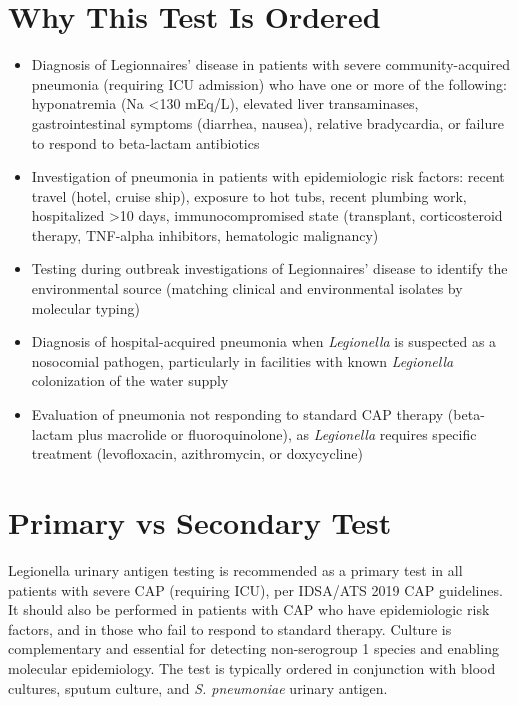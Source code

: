 \section*{Why This Test Is Ordered}
\begin{itemize}
  \item Diagnosis of Legionnaires' disease in patients with severe community-acquired pneumonia (requiring ICU admission) who have one or more of the following: hyponatremia (Na <130 mEq/L), elevated liver transaminases, gastrointestinal symptoms (diarrhea, nausea), relative bradycardia, or failure to respond to beta-lactam antibiotics
  \item Investigation of pneumonia in patients with epidemiologic risk factors: recent travel (hotel, cruise ship), exposure to hot tubs, recent plumbing work, hospitalized >10 days, immunocompromised state (transplant, corticosteroid therapy, TNF-alpha inhibitors, hematologic malignancy)
  \item Testing during outbreak investigations of Legionnaires' disease to identify the environmental source (matching clinical and environmental isolates by molecular typing)
  \item Diagnosis of hospital-acquired pneumonia when \textit{Legionella} is suspected as a nosocomial pathogen, particularly in facilities with known \textit{Legionella} colonization of the water supply
  \item Evaluation of pneumonia not responding to standard CAP therapy (beta-lactam plus macrolide or fluoroquinolone), as \textit{Legionella} requires specific treatment (levofloxacin, azithromycin, or doxycycline)
\end{itemize}

\section*{Primary vs Secondary Test}
Legionella urinary antigen testing is recommended as a primary test in all patients with severe CAP (requiring ICU), per IDSA/ATS 2019 CAP guidelines. It should also be performed in patients with CAP who have epidemiologic risk factors, and in those who fail to respond to standard therapy. Culture is complementary and essential for detecting non-serogroup 1 species and enabling molecular epidemiology. The test is typically ordered in conjunction with blood cultures, sputum culture, and \textit{S. pneumoniae} urinary antigen.

